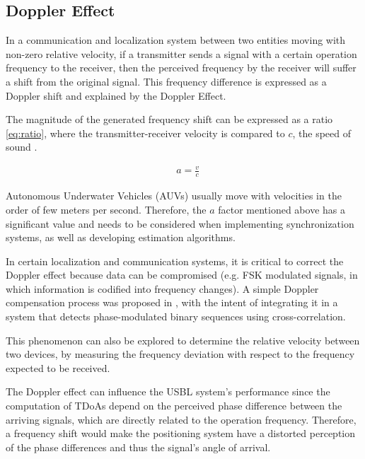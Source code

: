 \subsection{Doppler Effect} \label{subsec:doppler}

In a communication and localization system between two entities moving with non-zero relative velocity, if a transmitter sends a signal with a certain operation frequency to the receiver, then the perceived frequency by the receiver will suffer a shift from the original signal. This frequency difference is expressed as a Doppler shift and explained by the Doppler Effect.

The magnitude of the generated frequency shift can be expressed as a ratio \ref{eq:ratio}, where the transmitter-receiver velocity is compared to \(c\), the speed of sound \cite{commchan}.

\begin{eqnarray}
&a = \frac{v}{c}
\label{eq:ratio}
\end{eqnarray}

Autonomous Underwater Vehicles (AUVs) usually move with velocities in the order of few meters per second. Therefore, the \(a\) factor mentioned above has a significant value and needs to be considered when implementing synchronization systems, as well as developing estimation algorithms.


In certain localization and communication systems, it is critical to correct the Doppler effect because data can be compromised (e.g. FSK modulated signals, in which information is codified into frequency changes). A simple Doppler compensation process was proposed in \cite{thesis-joao}, with the intent of integrating it in a system that detects phase-modulated binary sequences using cross-correlation.

This phenomenon can also be explored to determine the relative velocity between two devices, by measuring the frequency deviation with respect to the frequency expected to be received.

The Doppler effect can influence the USBL system's performance since the computation of TDoAs depend on the perceived phase difference between the arriving signals, which are directly related to the operation frequency. Therefore, a frequency shift would make the positioning system have a distorted perception of the phase differences and thus the signal's angle of arrival.

